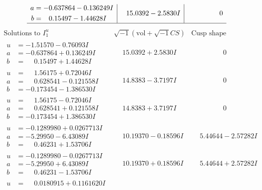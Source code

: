 \documentclass[1p]{elsarticle_modified}
\theoremstyle{definition}
\newcommand{\I}{\sqrt{-1}}
\begin{document}
$$\begin{array}{c|c|c}
\begin{aligned}
a &= -0.637864 - 0.136249 I \\
b &= \phantom{-}0.15497 - 1.44628 I\end{aligned}
 & \phantom{-}15.0392 - 2.5830 I & \phantom{-0.000000 } 0\\
 \hline 
 \end{array}$$\newpage$$\begin{array}{c|c|c}  
\text{Solutions to }I^u_{1}& \I (\text{vol} + \sqrt{-1}CS) & \text{Cusp shape}\\
 \hline 
\begin{aligned}
u &= -1.51570 - 0.76093 I \\
a &= -0.637864 + 0.136249 I \\
b &= \phantom{-}0.15497 + 1.44628 I\end{aligned}
 & \phantom{-}15.0392 + 2.5830 I & \phantom{-0.000000 } 0 \\ \hline\begin{aligned}
u &= \phantom{-}1.56175 + 0.72046 I \\
a &= \phantom{-}0.628541 - 0.121558 I \\
b &= -0.173454 - 1.386530 I\end{aligned}
 & \phantom{-}14.8383 - 3.7197 I & \phantom{-0.000000 } 0 \\ \hline\begin{aligned}
u &= \phantom{-}1.56175 - 0.72046 I \\
a &= \phantom{-}0.628541 + 0.121558 I \\
b &= -0.173454 + 1.386530 I\end{aligned}
 & \phantom{-}14.8383 + 3.7197 I & \phantom{-0.000000 } 0 \\ \hline\begin{aligned}
u &= -0.1289980 + 0.0267713 I \\
a &= -5.29950 - 6.43089 I \\
b &= \phantom{-}0.46231 + 1.53706 I\end{aligned}
 & \phantom{-}10.19370 - 0.18596 I & \phantom{-}5.44644 - 2.57282 I \\ \hline\begin{aligned}
u &= -0.1289980 - 0.0267713 I \\
a &= -5.29950 + 6.43089 I \\
b &= \phantom{-}0.46231 - 1.53706 I\end{aligned}
 & \phantom{-}10.19370 + 0.18596 I & \phantom{-}5.44644 + 2.57282 I \\ \hline\begin{aligned}
u &= \phantom{-}0.0180915 + 0.1161620 I \\

\end{aligned}
\end{array}$$
\end{document}
